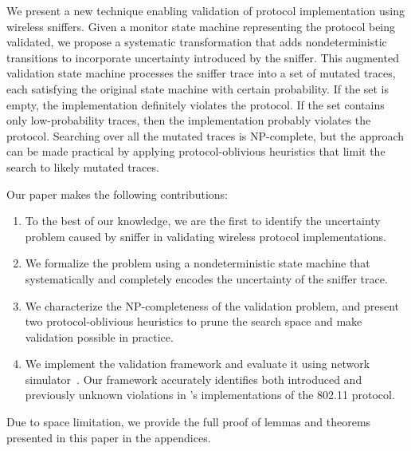 We present a new technique enabling validation of protocol implementation using
wireless sniffers. Given a monitor state machine representing the protocol being
validated, we propose a systematic transformation that adds nondeterministic
transitions to incorporate uncertainty introduced by the sniffer.  This
augmented validation state machine processes the sniffer trace into a set of
mutated traces, each satisfying the original state machine with certain
probability.  If the set is empty, the implementation definitely violates the
protocol.  If the set contains only low-probability traces, then the
implementation probably violates the protocol.  Searching over all the mutated
traces is NP-complete, but the approach can be made practical by applying
protocol-oblivious heuristics that limit the search to likely mutated traces.

Our paper makes the following contributions:
\begin{enumerate}
		  \item To the best of our knowledge, we are the first to identify the
    uncertainty problem caused by sniffer in validating wireless protocol
    implementations.
		  \item We formalize the problem using a nondeterministic state machine that
    systematically and completely encodes the uncertainty of the
    sniffer trace.
		    \item We characterize the NP-completeness of the validation problem, and
      present two protocol-oblivious heuristics to prune the search
      space and make validation possible in practice.
			\item We implement the validation framework and evaluate it using
    \ns{} network simulator~\cite{riley2010ns}.
		    Our framework accurately identifies both introduced and previously
    unknown violations in \ns{}'s implementations of the 802.11 protocol.
\end{enumerate}

Due to space limitation, we provide the full proof of lemmas and theorems
presented in this paper in the appendices.

\begin{comment}
The rest of this paper is organized as follows.
We motivate the uncertainty problem in Section~\ref{sec:model}.
We then formally describe the problem in Section~\ref{sec:framework},
including the completeness of the augmentation (\S~\ref{subsec:augment}),
hardness analysis (\S~\ref{subsec:hard}) and search algorithms
(\S~\ref{subsec:search}).
We continue by evaluating our framework through two case studies in
Section~\ref{sec:case}.  Finally, we present related works in
Section~\ref{sec:related} and concludes in Section~\ref{sec:conclusion}.
\end{comment}

